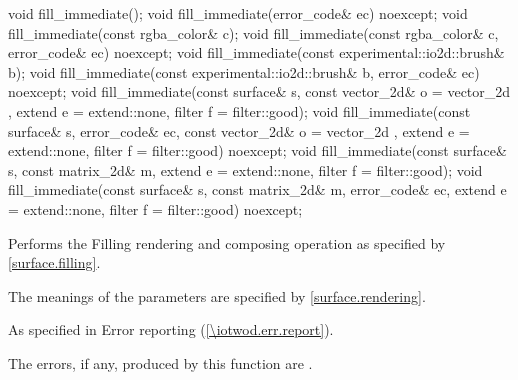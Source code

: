 \begin{itemdecl}
void fill_immediate();
void fill_immediate(error_code& ec) noexcept;
void fill_immediate(const rgba_color& c);
void fill_immediate(const rgba_color& c, error_code& ec) noexcept;
void fill_immediate(const experimental::io2d::brush& b);
void fill_immediate(const experimental::io2d::brush& b, error_code& ec)
  noexcept;
void fill_immediate(const surface& s, const vector_2d& o = vector_2d{ }, 
  extend e = extend::none, filter f = filter::good);
void fill_immediate(const surface& s, error_code& ec,
  const vector_2d& o = vector_2d{ }, extend e = extend::none,
  filter f = filter::good) noexcept;
void fill_immediate(const surface& s, const matrix_2d& m,
  extend e = extend::none, filter f = filter::good);
void fill_immediate(const surface& s, const matrix_2d& m, error_code& ec,
  extend e = extend::none, filter f = filter::good) noexcept;
\end{itemdecl}
\begin{itemdescr}
\pnum
\effects
Performs the Filling rendering and composing operation as specified by \ref{surface.filling}.

\pnum
The meanings of the parameters are specified by \ref{surface.rendering}.

\pnum
\throws
As specified in Error reporting (\ref{\iotwod.err.report}).

\pnum
\errors
The errors, if any, produced by this function are .
\end{itemdescr}

